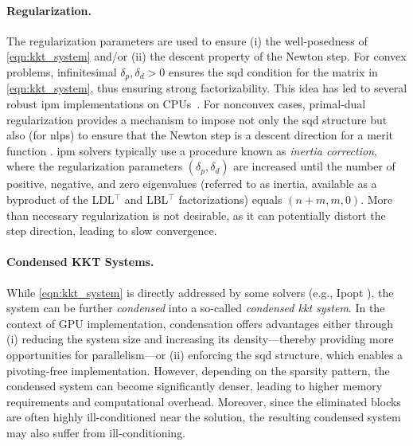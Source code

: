 \documentclass{article}
\begin{document}
\paragraph{Regularization.}
The regularization parameters are used to ensure (i) the well-posedness of \cref{eqn:kkt_system} and/or (ii) the descent property of the Newton step. For convex problems, infinitesimal $\delta_p, \delta_d > 0$ ensures the \gls*{sqd} condition for the matrix in \eqref{eqn:kkt_system}, thus ensuring strong factorizability. This idea has led to several robust \gls{ipm} implementations on CPUs~\cite{friedlanderPrimalDualRegularized2012}. For nonconvex cases, primal-dual regularization provides a mechanism to impose not only the \gls*{sqd} structure but also (for \glspl*{nlp}) to ensure that the Newton step is a descent direction for a merit function \cite{wachterImplementationInteriorpointFilter2006}. \Gls{ipm} solvers typically use a procedure known as \emph{inertia correction}, where the regularization parameters $(\delta_p, \delta_d)$ are increased until the number of positive, negative, and zero eigenvalues (referred to as inertia, available as a byproduct of the LDL$^\top$ and LBL$^\top$ factorizations) equals $(n+m, m, 0)$. More than necessary regularization is not desirable, as it can potentially distort the step direction, leading to slow convergence.


\paragraph{Condensed KKT Systems.}
While \cref{eqn:kkt_system} is directly addressed by some solvers (e.g., Ipopt \cite{wachterImplementationInteriorpointFilter2006}), the system can be further \emph{condensed} into a so-called \emph{condensed \gls*{kkt} system}.
In the context of GPU implementation, condensation offers advantages either through (i) reducing the system size and increasing its density—thereby providing more opportunities for parallelism—or (ii) enforcing the \gls*{sqd} structure, which enables a pivoting-free implementation.
However, depending on the sparsity pattern, the condensed system can become significantly denser, leading to higher memory requirements and computational overhead.
Moreover, since the eliminated blocks are often highly ill-conditioned near the solution, the resulting condensed system may also suffer from ill-conditioning.
\end{document}
